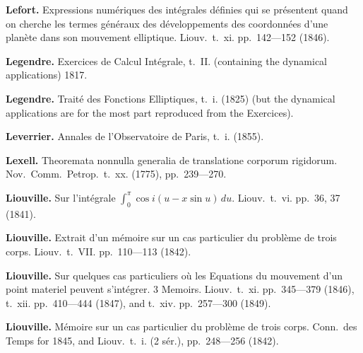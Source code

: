 \documentclass[11pt,a4paper]{book}
\begin{document}
\noindent\textbf{Lefort.} Expressions num\'{e}riques des int\'{e}grales d\'{e}finies qui se pr\'{e}sentent quand on cherche les termes g\'{e}n\'{e}raux des d\'{e}veloppements des coordonn\'{e}es d'une plan\`{e}te dans son mouvement elliptique. Liouv.~t.~xi. pp.~142---152 (1846).

\vspace{0.5em}

\noindent\textbf{Legendre.} Exercices de Calcul Int\'{e}grale, t.~II. (containing the dynamical applications) 1817.

\vspace{0.5em}

\noindent\textbf{Legendre.} Trait\'{e} des Fonctions Elliptiques, t.~i. (1825) (but the dynamical applications are for the most part reproduced from the Exercices).

\vspace{0.5em}

\noindent\textbf{Leverrier.} Annales de l'Observatoire de Paris, t.~i. (1855).

\vspace{0.5em}

\noindent\textbf{Lexell.} Theoremata nonnulla generalia de translatione corporum rigidorum. Nov.~Comm.~Petrop.~t.~xx. (1775), pp.~239---270.

\vspace{0.5em}

\noindent\textbf{Liouville.} Sur l'int\'{e}grale $\int_0^\pi \cos i(u - x \sin u)\, du$. Liouv.~t.~vi. pp.~36, 37 (1841).

\vspace{0.5em}

\noindent\textbf{Liouville.} Extrait d'un m\'{e}moire sur un cas particulier du probl\`{e}me de trois corps. Liouv.~t.~VII. pp.~110---113 (1842).

\vspace{0.5em}

\noindent\textbf{Liouville.} Sur quelques cas particuliers o\`{u} les Equations du mouvement d'un point materiel peuvent s'int\'{e}grer. 3 Memoirs. Liouv.~t.~xi. pp.~345---379 (1846), t.~xii. pp.~410---444 (1847), and t.~xiv. pp.~257---300 (1849).

\vspace{0.5em}

\noindent\textbf{Liouville.} M\'{e}moire sur un cas particulier du probl\`{e}me de trois corps. Conn.~des Temps for 1845, and Liouv.~t.~i. (2 s\'{e}r.), pp.~248---256 (1842).
\end{document}
